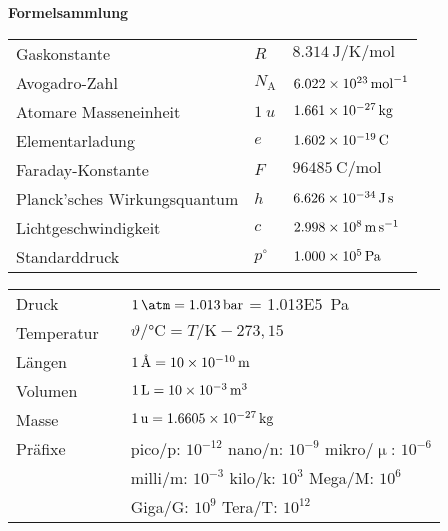 \documentclass[./main.tex]{subfiles}
\begin{document}
{\centering\large\bfseries Formelsammlung\\}

\begin{formulabox}[Naturkonstanten]
  \begin{center}
  \renewcommand{\arraystretch}{1.4}
    \begin{tabular}{>{\raggedleft}p{} >{\centering}p{} p{}}
        Gaskonstante & $R$ & $\SI{8.314}{\joule\per\kelvin\per\mole}$\\
        Avogadro-Zahl & $N_\mathrm{A} $ & $ \SI{6.022E23}{\per\mole}$\\
        Atomare Masseneinheit & $\SI{1}{u} $ & $ \SI{1,661E-27}{\kilo\gram}$\\
        Elementarladung & $e $ & $ \SI{1,602E-19}{\coulomb}$\\
        Faraday-Konstante & $F $ & $ \SI{96485}{\coulomb\per\mole}$\\
        Planck'sches Wirkungsquantum & $h $ & $ \SI{6,626E-34}{\joule\second}$\\
        Lichtgeschwindigkeit & $c$ & $ \SI{2,998E8}{\meter\per\second}$\\
        Standarddruck & $p^\circ$ & $\SI{1,000E5}{\pascal}$
    \end{tabular}
  \end{center}
\end{formulabox}

\begin{formulabox}[Einheiten]
  \begin{center}
  \renewcommand{\arraystretch}{1.4}
    \begin{tabular}{>{\raggedleft\arraybackslash}p{} p{}p{}}
        Druck & & $\SI{1}{\atm} = \SI{1.013}{\bar}$ = \SI{1.013E5}{\pascal}\\
        Temperatur & & $\vartheta / \si{\celsius} = T/\si{\kelvin} - 273,15$ \\
        L\"angen & & $\SI{1}{\angstrom}=\SI{10E-10}{\meter}$ \\
        Volumen & & $\SI{1}{\liter}=\SI{10E-3}{\cubic\meter}$ \\
        Masse & & $\SI{1}{\atomicmassunit}=\SI{1.6605E-27}{\kilo\gram}$ \\
        Pr\"afixe & & pico/p: $10^{-12}$\hspace{0.74cm} nano/n: $10^{-9}$\hspace{0.49cm} mikro/$\upmu$: $10^{-6}$ \\
        & &milli/m: $10^{-3}$\hspace{0.7cm} kilo/k: $10^{3}$\hspace{0.95cm} Mega/M: $10^{6}$\\
        & &Giga/G: $10^{9}$\hspace{0.95cm} Tera/T: $10^{12}$\\
    \end{tabular}
  \end{center}
\end{formulabox}
\end{document}
